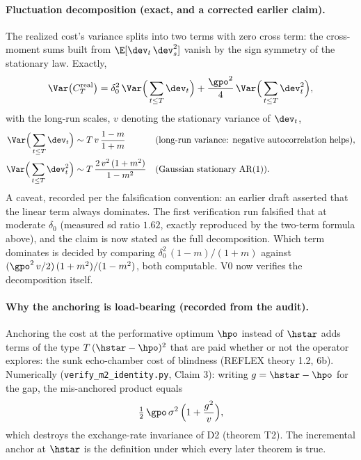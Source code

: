 \paragraph{Fluctuation decomposition (exact, and a corrected earlier
claim).}
The realized cost's variance splits into two terms with zero cross term:
the cross-moment sums built from $\E[\dev_t\,\dev_s^2]$ vanish by the sign
symmetry of the stationary law. Exactly,
\begin{equation*}
  \Var\big(C_T^{\mathrm{real}}\big)
  = \delta_0^2\,\Var\Big(\sum_{t\le T}\dev_t\Big)
  + \frac{\gpo^2}{4}\,\Var\Big(\sum_{t\le T}\dev_t^2\Big),
\end{equation*}
with the long-run scales, $v$ denoting the stationary variance of $\dev_t$,
\begin{align*}
  \Var\Big(\sum_{t\le T}\dev_t\Big)
    &\sim T\,v\,\frac{1-m}{1+m}
    && \text{(long-run variance: negative autocorrelation helps)},\\
  \Var\Big(\sum_{t\le T}\dev_t^2\Big)
    &\sim T\,\frac{2\,v^2\,(1+m^2)}{1-m^2}
    && \text{(Gaussian stationary AR(1))}.
\end{align*}
A caveat, recorded per the falsification convention: an earlier draft
asserted that the linear term always dominates. The first verification run
falsified that at moderate $\delta_0$ (measured sd ratio $1.62$, exactly
reproduced by the two-term formula above), and the claim is now stated as
the full decomposition. Which term dominates is decided by comparing
$\delta_0^2\,(1-m)/(1+m)$ against
$(\gpo^2\,v/2)\,(1+m^2)/(1-m^2)$, both computable. V0 now verifies the
decomposition itself.

\paragraph{Why the anchoring is load-bearing (recorded from the audit).}
Anchoring the cost at the performative optimum $\hpo$ instead of $\hstar$
adds terms of the type $T\,(\hstar - \hpo)^2$ that are paid whether or not
the operator explores: the sunk echo-chamber cost of blindness (REFLEX
theory 1.2, 6b). Numerically (\texttt{verify\_m2\_identity.py}, Claim 3):
writing $g = \hstar - \hpo$ for the gap, the mis-anchored product equals
\begin{equation*}
  \tfrac{1}{2}\,\gpo\,\sigma^2\,\Big(1 + \frac{g^2}{v}\Big),
\end{equation*}
which destroys the exchange-rate invariance of D2 (theorem T2). The
incremental anchor at $\hstar$ is the definition under which every later
theorem is true.

